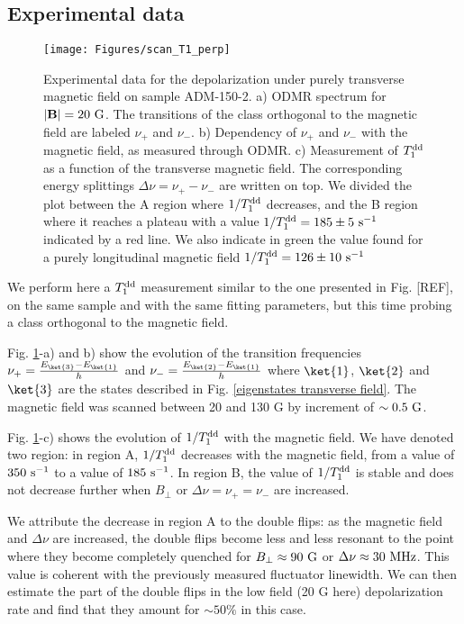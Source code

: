 \documentclass[a4paper,11pt]{report}
\begin{document}
\subsection{Experimental data}

\begin{figure}[h!]
\centering
\texttt{[image: Figures/scan\_T1\_perp]}
\caption{Experimental data for the depolarization under purely transverse magnetic field on sample ADM-150-2. a) ODMR spectrum for $|\mathbf{B}|=20\ \rm G$. The transitions of the class orthogonal to the magnetic field are labeled $\nu_+$ and $\nu_-$. b) Dependency of $\nu_+$ and $\nu_-$ with the magnetic field, as measured through ODMR. c) Measurement of $T_1^{\rm dd}$ as a function of the transverse magnetic field. The corresponding energy splittings $\Delta \nu=\nu_+-\nu_-$ are written on top. We divided the plot between the A region where $1/T_1^{\rm dd}$ decreases, and the B region where it reaches a plateau with a value $1/T_1^{\rm dd}=185 \pm 5\ \rm s^{-1}$ indicated by a red line. We also indicate in green the value found for a purely longitudinal magnetic field $1/T_1^{\rm dd}=126 \pm 10\ \rm s^{-1}$}
\label{champ tranverse exp}
\end{figure}

We perform here a $T_1^{\rm dd}$ measurement similar to the one presented in Fig. [REF], on the same sample and with the same fitting parameters, but this time probing a class orthogonal to the magnetic field.

Fig. \ref{champ tranverse exp}-a) and b) show the evolution of the transition frequencies $\nu_+=\frac{E_{\ket{3}}-E_{\ket{1}}}{h}$ and $\nu_-=\frac{E_{\ket{2}}-E_{\ket{1}}}{h}$ where $\ket{1}$, $\ket{2}$ and $\ket{3}$ are the states described in Fig. \ref{eigenstates transverse field}. The magnetic field was scanned between 20 and 130 G by increment of $\sim 0.5\ \rm G$.

Fig. \ref{champ tranverse exp}-c) shows the evolution of $1/T_1^{\rm dd}$ with the magnetic field. We have denoted two region: in region A, $1/T_1^{\rm dd}$ decreases with the magnetic field, from a value of $350\ \rm s^{-1}$ to a value of $185\ \rm s^{-1}$. In region B, the value of $1/T_1^{\rm dd}$ is stable and does not decrease further when $B_\perp$ or $\Delta \nu=\nu_+=\nu_-$ are increased.

We attribute the decrease in region A to the double flips: as the magnetic field and $\Delta \nu$ are increased, the double flips become less and less resonant to the point where they become completely quenched for $B_\perp \approx 90\ \rm G$ or $\Delta \nu \approx 30\ \rm MHz$. This value is coherent with the previously measured fluctuator linewidth. We can then estimate the part of the double flips in the low field (20 G here) depolarization rate and find that they amount for $\sim 50\%$ in this case.
\end{document}
